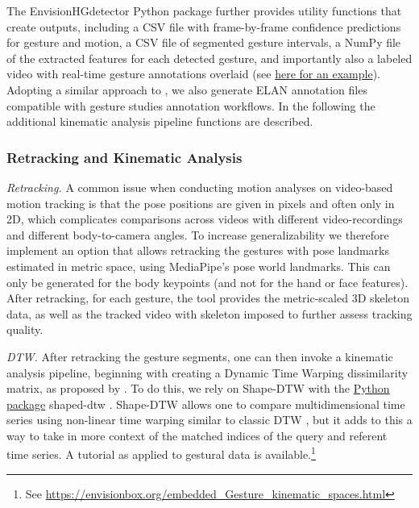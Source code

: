 \documentclass[11pt,headings=small,cleardoublepage=empty,tocflat,numbers=noenddot,twoside,captions=tableheading]{scrbook}
\begin{document}
\begin{refsection}
\begin{table}[H]
\begin{table}[H]
\begin{table}[H]
The EnvisionHGdetector Python package further provides utility functions that create outputs, including a CSV file with frame-by-frame confidence predictions for gesture and motion, a CSV file of segmented gesture intervals, a NumPy file of the extracted features for each detected gesture, and importantly also a labeled video with real-time gesture annotations overlaid (see \href{https://osf.io/e4drq}{here for an example}). Adopting a similar approach to \citet{ienagaSemiautomationGestureAnnotation2022}, we also generate ELAN annotation files compatible with gesture studies annotation workflows. In the following the additional kinematic analysis pipeline functions are described.

\subsubsection{Retracking and Kinematic Analysis}
\emph{Retracking.}
A common issue when conducting motion analyses on video-based motion tracking is that the pose positions are given in pixels and often only in 2D, which complicates comparisons across videos with different video-recordings and different body-to-camera angles. To increase generalizability we therefore implement an option that allows retracking the gestures with pose landmarks estimated in metric space, using MediaPipe's pose world landmarks. This can only be generated for the body keypoints (and not for the hand or face features). After retracking, for each gesture, the tool provides the metric-scaled 3D skeleton data, as well as the tracked video with skeleton imposed to further assess tracking quality.

\emph{DTW.} 
After retracking the gesture segments, one can then invoke a kinematic analysis pipeline, beginning with creating a Dynamic Time Warping \parencite{giorginoComputingVisualizingDynamic2009} dissimilarity matrix, as proposed by \citet{pouwGestureNetworksIntroducing2019}. To do this, we rely on Shape-DTW \parencite{zhaoShapeDTWShapeDynamic2016} with the \href{https://github.com/MikolajSzafraniecUPDS/shapedtw-python}{Python package} shaped-dtw \parencite{szafraniecMikolajSzafraniecUPDSShapedtwpython2025}. Shape-DTW allows one to compare multidimensional time series using non-linear time warping similar to classic DTW \parencite{giorginoComputingVisualizingDynamic2009a}, but it adds to this a way to take in more context of the matched indices of the query and referent time series. A tutorial as applied to gestural data is available.\footnote{See \url{https://envisionbox.org/embedded_Gesture_kinematic_spaces.html}}


\end{table}
\end{table}
\end{table}
\end{refsection}
\end{document}
